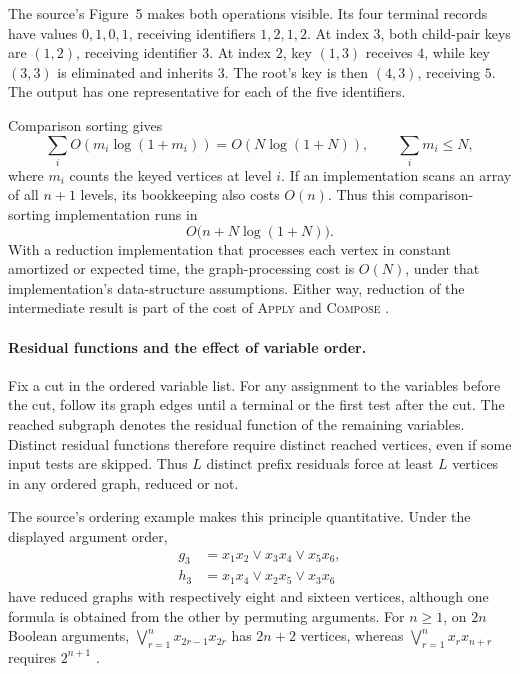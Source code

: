The source's Figure~5 makes both operations visible. Its four terminal
records have values \(0,1,0,1\), receiving identifiers \(1,2,1,2\).
At index \(3\), both child-pair keys are \((1,2)\), receiving identifier \(3\).
At index \(2\), key \((1,3)\) receives \(4\), while key \((3,3)\) is eliminated
and inherits \(3\). The root's key is then \((4,3)\), receiving \(5\).
The output has one representative for each of the five identifiers.

Comparison sorting gives
\[
 \sum_i O(m_i\log(1+m_i))=O(N\log(1+N)),
 \qquad \sum_i m_i\leq N,
\]
where \(m_i\) counts the keyed vertices at level \(i\). If an implementation
scans an array of all \(n+1\) levels, its bookkeeping also costs \(O(n)\).
Thus this comparison-sorting implementation runs in
\[
 O\bigl(n+N\log(1+N)\bigr).
\]
With a reduction implementation that processes each vertex in constant
amortized or expected time, the graph-processing cost is \(O(N)\), under
that implementation's data-structure assumptions. Either way, reduction
of the intermediate result is part of the cost of \textsc{Apply} and
\textsc{Compose} \cite[\S4.2 and table~1]{Bryant1986}.

\paragraph{Residual functions and the effect of variable order.}
Fix a cut in the ordered variable list. For any assignment to the
variables before the cut, follow its graph edges until a terminal
or the first test after the cut. The reached subgraph denotes the
residual function of the remaining variables. Distinct residual
functions therefore require distinct reached vertices, even if
some input tests are skipped. Thus \(L\) distinct prefix residuals
force at least \(L\) vertices in any ordered graph, reduced or not.

The source's ordering example makes this principle quantitative. Under
the displayed argument order,
\[
 \begin{aligned}
  g_3&=x_1x_2\lor x_3x_4\lor x_5x_6,\\
  h_3&=x_1x_4\lor x_2x_5\lor x_3x_6
 \end{aligned}
\]
have reduced graphs with respectively eight and sixteen vertices, although
one formula is obtained from the other by permuting arguments.
For \(n\geq1\), on \(2n\) Boolean arguments,
\(\bigvee_{r=1}^{n}x_{2r-1}x_{2r}\) has \(2n+2\) vertices, whereas
\(\bigvee_{r=1}^{n}x_rx_{n+r}\) requires \(2^{n+1}\)
\cite[\S3.2 and fig.~2]{Bryant1986}.

